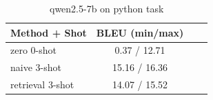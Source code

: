 \begin{table}[ht]
\centering
\small
\caption{qwen2.5-7b on python task}
\begin{tabular}{lccc}
\hline
Method + Shot & BLEU (min/max) \\
\hline
zero 0-shot & 0.37 / 12.71 \\
naive 3-shot & 15.16 / 16.36 \\
retrieval 3-shot & 14.07 / 15.52 \\
\hline
\end{tabular}
\end{table}
